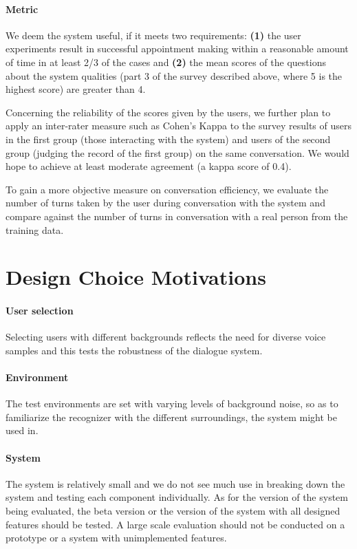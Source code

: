 \documentclass{article}
\begin{document}
\paragraph{Metric}

We deem the system useful, if it meets two requirements: \textbf{(1)} the user experiments result in successful appointment making within a reasonable amount of time in at least 2/3 of the cases and
\textbf{(2)} the mean scores of the questions about the system qualities (part 3 of the survey described above, where 5 is the highest score) are greater than 4. %
\vspace{0.5cm}

\noindent Concerning the reliability of the scores given by the users, we further plan to apply an inter-rater measure such as Cohen's Kappa to the survey results of users in the first group (those interacting with the system) and users of the second group (judging the record of the first group) on the same conversation. We would hope to achieve at least moderate agreement (a kappa score of 0.4).
\vspace{0.5cm}

\noindent To gain a more objective measure on conversation efficiency, we evaluate the number of turns taken by the user during conversation with the system and compare against the number of turns in conversation with a real person from the training data.
\section{Design Choice Motivations}
\paragraph{User selection} Selecting users with different backgrounds reflects the need for diverse voice samples and this tests the robustness of the dialogue system.
\paragraph{Environment} The test environments are set with varying levels of background noise, so as to familiarize the recognizer with the different surroundings, the system might be used in. 
\paragraph{System}
The system is relatively small and we do not see much use in breaking down the system and testing each component individually. As for the version of the system being evaluated, the beta version or the version of the system with all designed features should be tested. A large scale evaluation should not be conducted on a prototype or a system with unimplemented features.
\end{document}
